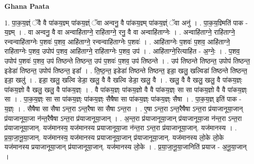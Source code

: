 \documentclass[17pt]{extarticle}
\begin{document}
\textbf{Ghana Paata } \newline

1. पा॒क॒य॒ज्ञ्ं ॅवै वै पा॑कय॒ज्ञ्म् पा॑कय॒ज्ञ्ं ॅवा अन्वनु॒ वै पा॑कय॒ज्ञ्म् पा॑कय॒ज्ञ्ं ॅवा अनु॑ । . पा॒क॒य॒ज्ञ्मिति॑ पाक - य॒ज्ञ्म् । . वा अन्वनु॒ वै वा अन्वाहि॑ताग्ने॒ राहि॑ताग्ने॒ रनु॒ वै वा अन्वाहि॑ताग्नेः । . अन्वाहि॑ताग्ने॒ राहि॑ताग्ने॒ रन्वन्वाहि॑ताग्नेः प॒शवः॑ प॒शव॒ आहि॑ताग्ने॒ रन्वन्वाहि॑ताग्नेः प॒शवः॑ । . आहि॑ताग्नेः प॒शवः॑ प॒शव॒ आहि॑ताग्ने॒ राहि॑ताग्नेः प॒शव॒ उपोप॑ प॒शव॒ आहि॑ताग्ने॒ राहि॑ताग्नेः प॒शव॒ उप॑ । . आहि॑ताग्ने॒रित्याहि॑त - अ॒ग्नेः॒ । . प॒शव॒ उपोप॑ प॒शवः॑ प॒शव॒ उप॑ तिष्ठन्ते तिष्ठन्त॒ उप॑ प॒शवः॑ प॒शव॒ उप॑ तिष्ठन्ते । . उप॑ तिष्ठन्ते तिष्ठन्त॒ उपोप॑ तिष्ठन्त॒ इडेडा॑ तिष्ठन्त॒ उपोप॑ तिष्ठन्त॒ इडा᳚ । . ति॒ष्ठ॒न्त॒ इडेडा॑ तिष्ठन्ते तिष्ठन्त॒ इडा॒ खलु॒ खल्विडा॑ तिष्ठन्ते तिष्ठन्त॒ इडा॒ खलु॑ । . इडा॒ खलु॒ खल्वि डेडा॒ खलु॒ वै वै खल्वि डेडा॒ खलु॒ वै । . खलु॒ वै वै खलु॒ खलु॒ वै पा॑कय॒ज्ञ्ः पा॑कय॒ज्ञो वै खलु॒ खलु॒ वै पा॑कय॒ज्ञ्ः । . वै पा॑कय॒ज्ञ्ः पा॑कय॒ज्ञो वै वै पा॑कय॒ज्ञ्ः सा सा पा॑कय॒ज्ञो वै वै पा॑कय॒ज्ञ्ः सा । . पा॒क॒य॒ज्ञ्ः सा सा पा॑कय॒ज्ञ्ः पा॑कय॒ज्ञ्ः सैषैषा सा पा॑कय॒ज्ञ्ः पा॑कय॒ज्ञ्ः सैषा । . पा॒क॒य॒ज्ञ् इति॑ पाक - य॒ज्ञ्ः । . सैषैषा सा सैषा ऽन्त॒रा ऽन्त॒रैषा सा सैषा ऽन्त॒रा । . ए॒षा ऽन्त॒रा ऽन्त॒रैषैषा ऽन्त॒रा प्र॑याजानूया॒जान् प्र॑याजानूया॒जा न॑न्त॒रैषैषा ऽन्त॒रा प्र॑याजानूया॒जान् । . अ॒न्त॒रा प्र॑याजानूया॒जान् प्र॑याजानूया॒जा न॑न्त॒रा ऽन्त॒रा प्र॑याजानूया॒जान्. यज॑मानस्य॒ यज॑मानस्य प्रयाजानूया॒जा न॑न्त॒रा ऽन्त॒रा प्र॑याजानूया॒जान्. यज॑मानस्य । . प्र॒या॒जा॒नू॒या॒जान्. यज॑मानस्य॒ यज॑मानस्य प्रयाजानूया॒जान् प्र॑याजानूया॒जान्. यज॑मानस्य लो॒के लो॒के यज॑मानस्य प्रयाजानूया॒जान् प्र॑याजानूया॒जान्. यज॑मानस्य लो॒के । . प्र॒या॒जा॒नू॒या॒जानिति॑ प्रयाज - अ॒नू॒या॒जान् । \newline
\end{document}
